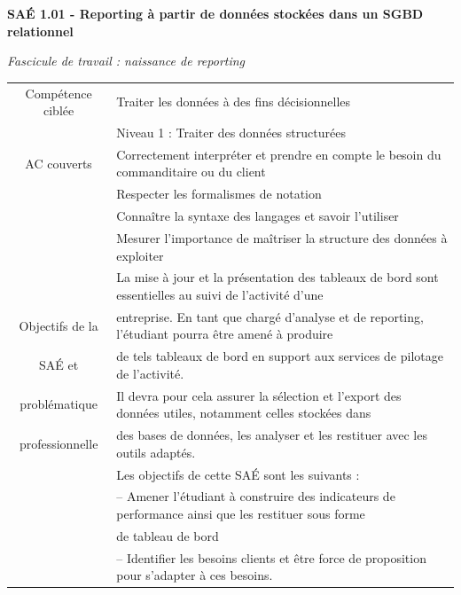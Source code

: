 \documentclass[10pt, a4paper]{article}
\begin{document}
\begin{titlepage}
    \begin{center}
            
        \huge
        \textbf{SAÉ 1.01 - Reporting à partir de données stockées dans un SGBD relationnel }
            
        \LARGE
        \textit{Fascicule de travail : naissance de reporting }
            
        \vspace{1cm}
            \small
        \begin{tabular}{|c|l|}\hline
             Compétence ciblée&  Traiter les données à des fins décisionnelles   \\\
             & Niveau 1 : Traiter des données structurées   \\\hline
             AC couverts& Correctement interpréter et prendre en compte le besoin du commanditaire ou du client   \\
             &  Respecter les formalismes de notation   \\
             &  Connaître la syntaxe des langages et savoir l’utiliser   \\
             & Mesurer l’importance de maîtriser la structure des données à exploiter   \\ \hline
              & La mise à jour et la présentation des tableaux de bord sont essentielles au suivi de   l’activité  d’une \\
             Objectifs de la & entreprise. En tant que chargé d’analyse et de reporting, l’étudiant pourra être amené à produire \\
             SAÉ  et  &  de tels tableaux de bord en support aux services de pilotage de l’activité.\\
                problématique & Il devra pour cela assurer la sélection et l’export des données utiles, notamment celles stockées dans\\
              professionnelle &  des bases de données, les analyser et les restituer avec les outils adaptés.\\
                & Les objectifs de cette SAÉ sont les suivants : \\
                & – Amener l’étudiant à construire des indicateurs de performance ainsi que les restituer sous forme\\
                &  de tableau de bord\\
                & – Identifier les besoins clients et être force de proposition pour s’adapter à ces besoins.\\

\end{tabular}
\end{center}
\end{titlepage}
\end{document}
